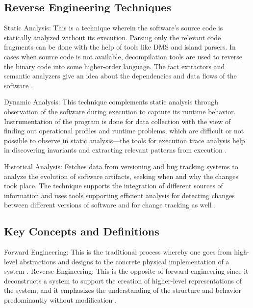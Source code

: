 \subsection{Reverse Engineering Techniques}

Static Analysis: This is a technique wherein the software's source code is statically analyzed without its execution. Parsing only the relevant code fragments can be done with the help of tools like DMS and island parsers. In cases when source code is not available, decompilation tools are used to reverse the binary code into some higher-order language. The fact extractors and semantic analyzers give an idea about the dependencies and data flows of the software \cite{ReverseEngineering1990}.

Dynamic Analysis: This technique complements static analysis through observation of the software during execution to capture its runtime behavior. Instrumentation of the program is done for data collection with the view of finding out operational profiles and runtime problems, which are difficult or not possible to observe in static analysis—the tools for execution trace analysis help in discovering invariants and extracting relevant patterns from execution \cite{ReverseEngineering1990} \cite{ReverseEngineering2011}.

Historical Analysis: Fetches data from versioning and bug tracking systems to analyze the evolution of software artifacts, seeking when and why the changes took place. The technique supports the integration of different sources of information and uses tools supporting efficient analysis for detecting changes between different versions of software and for change tracking as well \cite{ReverseEngineering1990}.

\subsection{Key Concepts and Definitions}

Forward Engineering: This is the traditional process whereby one goes from high-level abstractions and designs to the concrete physical implementation of a system \cite{ReverseEngineering2005}.
Reverse Engineering: This is the opposite of forward engineering since it deconstructs a system to support the creation of higher-level representations of the system, and it emphasizes the understanding of the structure and behavior predominantly without modification \cite{ReverseEngineering2005} \cite{ReverseEngineering2011}.

